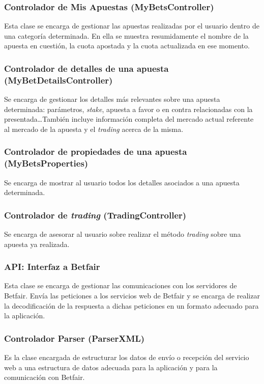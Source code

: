 \subsubsection{Controlador de Mis Apuestas (MyBetsController)}
 Esta clase se encarga de gestionar las apuestas realizadas por el usuario dentro de una categoría determinada. En ella se muestra resumidamente el nombre de la apuesta en cuestión, la cuota apostada y la cuota actualizada en ese momento. 

\subsubsection{Controlador de detalles de una apuesta (MyBetDetailsController)}
 Se encarga de gestionar los detalles más relevantes sobre una apuesta determinada: parámetros, \emph{stake}, apuesta a favor o en contra relacionadas con la presentada\ldots También incluye información completa del mercado actual referente al mercado de la apuesta y el \emph{trading} acerca de la misma.
 
 \subsubsection{Controlador de propiedades de una apuesta (MyBetsProperties)}
 Se encarga de mostrar al usuario todos los detalles asociados a una apuesta determinada. 

\subsubsection{Controlador de \emph{trading} (TradingController)}
  Se encarga de asesorar al usuario sobre realizar el método \emph{trading} sobre una apuesta ya realizada. 
  
\subsubsection{API: Interfaz a Betfair}
 Esta clase se encarga de gestionar las comunicaciones con los servidores de Betfair. Envía las peticiones a los servicios web de Betfair y se encarga de realizar la decodificación de la respuesta a dichas peticiones en un formato adecuado para la aplicación.

\subsubsection{Controlador Parser (ParserXML)}
 Es la clase encargada de estructurar los datos de envío o recepción del servicio web a una estructura de datos adecuada para la aplicación y para la comunicación con Betfair.

